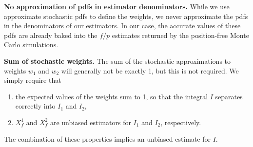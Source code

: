 {\bf No approximation of pdfs in estimator denominators.} While we use approximate stochastic pdfs to define the weights, we never approximate the pdfs in the denominators of our estimators. In our case, the accurate values of these pdfs are already baked into the $f/p$ estimates returned by the position-free Monte Carlo simulations.

{\bf Sum of stochastic weights.} The sum of the stochastic approximations to weights $w_1$ and $w_2$ will generally not be exactly 1, but this is not required. We simply require that
\begin{enumerate}
	\item the expected values of the weights sum to 1, so that the integral $I$ separates correctly into $I_1$ and $I_2$,
	\item $X_f^1$ and $X_f^2$ are unbiased estimators for $I_1$ and $I_2$, respectively.
\end{enumerate}
The combination of these properties implies an unbiased estimate for $I$.
